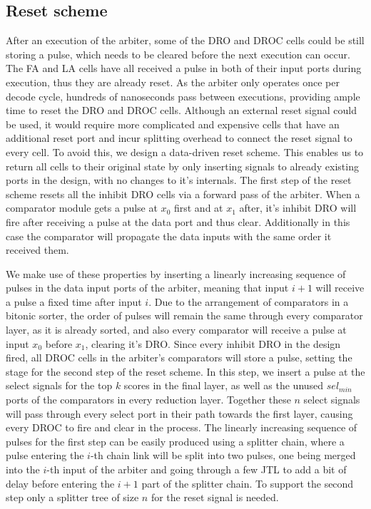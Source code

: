 \documentclass[conference]{IEEEtran}
\begin{document}
\subsection{Reset scheme}

After an execution of the arbiter, some of the DRO and DROC cells could be still storing a pulse, which needs to be cleared before the next execution can occur.
The FA and LA cells have all received a pulse in both of their input ports during execution, thus they are already reset.
As the arbiter only operates once per decode cycle, hundreds of nanoseconds pass between executions, providing ample time to reset the DRO and DROC cells.
Although an external reset signal could be used, it would require more complicated and expensive cells that have an additional reset port and incur splitting overhead to connect the reset signal to every cell.
To avoid this, we design a data-driven reset scheme.
This enables us to return all cells to their original state by only inserting signals to already existing ports in the design, with no changes to it's internals.
The first step of the reset scheme resets all the inhibit DRO cells via a forward pass of the arbiter.
When a comparator module gets a pulse at $x_0$ first and at $x_1$ after, it's inhibit DRO will fire after receiving a pulse at the data port and thus clear.
Additionally in this case the comparator will propagate the data inputs with the same order it received them.

We make use of these properties by inserting a linearly increasing sequence of pulses in the data input ports of the arbiter, meaning that input $i+1$ will receive a pulse a fixed time after input $i$.
Due to the arrangement of comparators in a bitonic sorter, the order of pulses will remain the same through every comparator layer, as it is already sorted, and also every comparator will receive a pulse at input $x_0$ before $x_1$, clearing it's DRO.
Since every inhibit DRO in the design fired, all DROC cells in the arbiter's comparators will store a pulse, setting the stage for the second step of the reset scheme.
In this step, we insert a pulse at the select signals for the top $k$ scores in the final layer, as well as the unused $sel_{min}$ ports of the comparators in every reduction layer.
Together these $n$ select signals will pass through every select port in their path towards the first layer, causing every DROC to fire and clear in the process.
The linearly increasing sequence of pulses for the first step can be easily produced using a splitter chain, where a pulse entering the $i$-th chain link will be split into two pulses, one being merged into the $i$-th input of the arbiter and going through a few JTL to add a bit of delay before entering the $i+1$ part of the splitter chain.
To support the second step only a splitter tree of size $n$ for the reset signal is needed.
\end{document}
